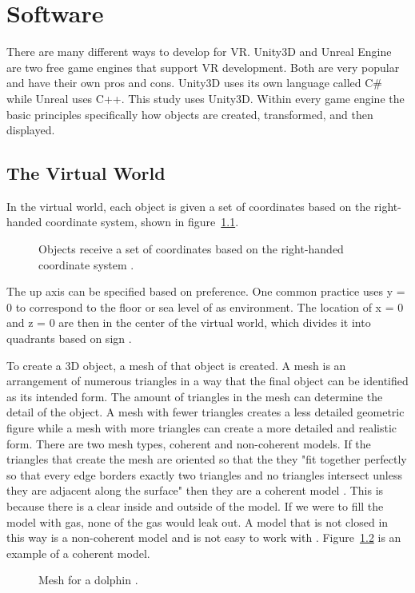 \chapter{Software}
There are many different ways to develop for VR. Unity3D and Unreal Engine are two free game engines that support VR development. Both are very popular and have their own pros and cons. Unity3D uses its own language called C\# while Unreal uses C++. This study uses Unity3D. Within every game engine the basic principles specifically how objects are created, transformed, and then displayed.  

\section{The Virtual World}
In the virtual world, each object is given a set of coordinates based on the right-handed coordinate system, shown in figure~\ref{fig:objectPlacement}. 
\begin{figure}[!ht]
	\begin{center}
	\end{center}
	\caption{Objects receive a set of coordinates based on the right-handed coordinate system 
		\cite{LaValle2017}.} \label{fig:objectPlacement}
\end{figure}The up axis can be specified based on preference. One common practice uses y = 0 to correspond to the floor or sea level of as environment. The location of x = 0 and z = 0 are then in the center of the virtual world, which divides it into quadrants based on sign \cite{LaValle2017}. 


To create a 3D object, a mesh of that object is created. A mesh is an arrangement of numerous triangles in a way that the final object can be identified as its intended form. The amount of triangles in the mesh can determine the detail of the object. A mesh with fewer triangles creates a less detailed geometric figure while a mesh with more triangles can create a more detailed and realistic form. There are two mesh types, coherent and non-coherent models. If the triangles that create the mesh are oriented so that the they "fit together perfectly so that every edge borders exactly two triangles and no triangles intersect unless they are adjacent along the surface" then they are a coherent model \cite{LaValle2017}. This is because there is a clear inside and outside of the model. If we were to fill the model with gas, none of the gas would leak out. A model that is not closed in this way is a non-coherent model and is not easy to work with \cite{LaValle2017}. Figure~\ref{fig:meshDolphin} is an example of a coherent model.
\begin{figure}[!ht]
	\begin{center}
	\end{center}
	\caption{Mesh for a dolphin \cite{LaValle2017}.} \label{fig:meshDolphin}
\end{figure}



